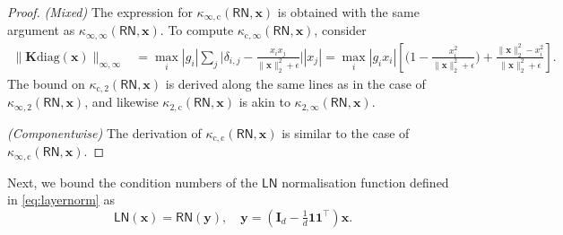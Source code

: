 \documentclass[namedate,webpdf,imanum]{ima-authoring-template}
\newcommand{\Matrix}[1]{\mathbf{#1}}
\newcommand{\trans}{\intercal}
\newcommand{\diag}[2][]{\mathrm{diag}#1( #2 #1)}
\newcommand{\Norm}[3][]{#1\| #2 #1\|_{\mathrm{#3}}}
\newcommand{\One}{\Matrix{1}}
\newcommand{\Layer}[1]{\mathsf{#1}}
\newcommand{\cond}[3][]{\kappa_{\mathrm{#2}} #1( #3 #1)}
\numberwithin{equation}{section}
\begin{document}
\begin{proof}
\emph{(Mixed)}
The expression for $\cond{\infty,c}{\Layer{RN}, \Matrix{x}}$ is obtained with the same argument as $\cond{\infty,\infty}{\Layer{RN}, \Matrix{x}}$.
To compute $\cond{c,\infty}{\Layer{RN}, \Matrix{x}}$, consider
\begin{align*}
    \Norm{\Matrix{K}\diag{\Matrix{x}}}{\infty,\infty} &= \max_{i} |g_i| \sum_{j} \bigg|\delta_{i,j} - \frac{x_i x_j}{\Norm{\Matrix{x}}{2}^2 + \epsilon}\bigg| |x_j| = \max_{i} |g_i x_i| \left[ \bigg( 1 - \frac{x_i^2}{\Norm{\Matrix{x}}{2}^2 + \epsilon} \bigg) + \frac{\Norm{\Matrix{x}}{2}^2 - x_i^2}{\Norm{\Matrix{x}}{2}^2 + \epsilon} \right].
\end{align*}
The bound on $\cond{c,2}{\Layer{RN}, \Matrix{x}}$ is derived along the same lines as in the case of $\cond{\infty,2}{\Layer{RN}, \Matrix{x}}$, and likewise $\cond{2,c}{\Layer{RN}, \Matrix{x}}$ is akin to $\cond{2,\infty}{\Layer{RN}, \Matrix{x}}$.

\emph{(Componentwise)}
The derivation of $\cond{c,c}{\Layer{RN}, \Matrix{x}}$ is similar to the case of $\cond{\infty,c}{\Layer{RN}, \Matrix{x}}$.
\end{proof}

Next, we bound the condition numbers of the $\Layer{LN}$ normalisation function defined in \eqref{eq:layernorm} as
\begin{equation*}
    \Layer{LN}(\Matrix{x}) = \Layer{RN}(\Matrix{y}), \quad \Matrix{y} = \left(\Matrix{I}_d - \tfrac{1}{d} \One \One^\trans \right) \Matrix{x}.
\end{equation*}
\end{document}
